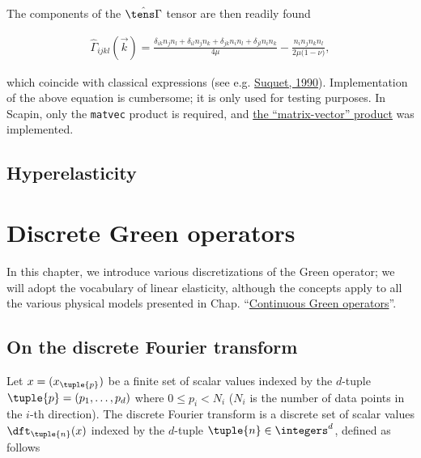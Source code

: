 \documentclass[oneside]{memoir}
\begin{document}
The components of the \(\hat{\tens \Gamma}\) tensor are then readily found



\begin{equation*}
\begin{split}\hat{\Gamma}_{ijkl}(\vec k)
=\frac{\delta_{ik}n_jn_l+\delta_{il}n_jn_k+\delta_{jk}n_in_l+\delta_{jl}n_in_k}{4\mu}
-\frac{n_in_jn_kn_l}{2\mu\bigl(1-\nu\bigr)},\end{split}\end{equation*}


which coincide with classical expressions (see e.g. \hyperlink{16288211201909122901}{Suquet, 1990}). Implementation of the above equation is cumbersome; it is only used for testing purposes. In Scapin, only the \texttt{matvec} product is required, and \hyperlink{7864328272685039520}{the “matrix-vector” product} was implemented.



\hypertarget{16861761838597320957}{}


\section{Hyperelasticity}



\hypertarget{1050018100428169985}{}


\chapter{Discrete Green operators}



In this chapter, we introduce various discretizations of the Green operator; we will adopt the vocabulary of linear elasticity, although the concepts apply to all the various physical models presented in Chap. “\hyperlink{11249657459891667799}{Continuous Green operators}”.



\hypertarget{5250349235821641230}{}


\section{On the discrete Fourier transform}



Let \(x=(x_{\tuple{p}})\) be a finite set of scalar values indexed by the \(d\)-tuple \(\tuple{p}=(p_1, \ldots, p_d)\) where \(0\leq p_i<N_i\) (\(N_i\) is the number of data points in the \(i\)-th direction). The discrete Fourier transform is a discrete set of scalar values \(\dft_{\tuple{n}}(x)\) indexed by the \(d\)-tuple \(\tuple{n}\in\integers^d\), defined as follows
\end{document}
